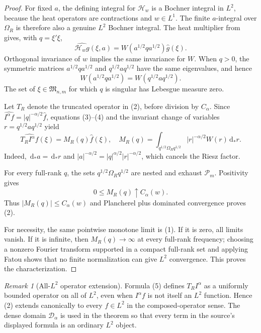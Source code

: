 \documentclass[11pt]{article}
\theoremstyle{remark}
\newtheorem{remark}[theorem]{Remark}
\newcommand{\Pm}{\mathcal P_m}
\newcommand{\Mn}{\mathfrak M_{n,m}}
\newcommand{\dd}{\,\mathrm d}
\newcommand{\Hc}{\mathcal H}
\begin{document}
\begin{proof}
For fixed $a$, the defining integral for $\Hc_w$ is a Bochner integral in
$L^2$, because the heat operators are contractions and $w\in L^1$.  The
finite $a$-integral over $\Omega_R$ is therefore also a genuine $L^2$
Bochner integral.  The heat multiplier from \cite[formula (8.15)]{source}
gives, with $q=\xi'\xi$,
\[
 \widehat{\Hc_wg}(\xi,a)=W(a^{1/2}qa^{1/2})\widehat g(\xi).       \tag{3}
\]
Orthogonal invariance of $w$ implies the same invariance for $W$.  When
$q>0$, the symmetric matrices $a^{1/2}qa^{1/2}$ and
$q^{1/2}aq^{1/2}$ have the same eigenvalues, and hence
\[
 W(a^{1/2}qa^{1/2})=W(q^{1/2}aq^{1/2}).                          \tag{4}
\]
The set of $\xi\in\Mn$ for which $q$ is singular has Lebesgue measure zero.

Let $T_R$ denote the truncated operator in (2), before division by
$C_\alpha$.  Since
$\widehat{I^\alpha f}=|q|^{-\alpha/2}\widehat f$, equations (3)--(4) and
the invariant change of variables $r=q^{1/2}aq^{1/2}$ yield
\[
 \widehat{T_RI^\alpha f}(\xi)=M_R(q)\widehat f(\xi),
\quad
 M_R(q)=\int_{q^{1/2}\Omega_Rq^{1/2}}
          |r|^{-\alpha/2}W(r)\dd_*r.                             \tag{5}
\]
Indeed, $\dd_*a=\dd_*r$ and
$|a|^{-\alpha/2}=|q|^{\alpha/2}|r|^{-\alpha/2}$, which cancels the
Riesz factor.

For every full-rank $q$, the sets $q^{1/2}\Omega_Rq^{1/2}$ are nested and
exhaust $\Pm$.  Positivity gives
\[
 0\leq M_R(q)\uparrow C_\alpha(w).
\]
Thus $|M_R(q)|\leq C_\alpha(w)$ and Plancherel plus dominated convergence
proves (2).

For necessity, the same pointwise monotone limit is (1).  If it is zero, all
limits vanish.  If it is infinite, then $M_R(q)\to\infty$ at every full-rank
frequency; choosing a nonzero Fourier transform supported in a compact
full-rank set and applying Fatou shows that no finite normalization can give
$L^2$ convergence.  This proves the characterization.
\end{proof}

\begin{remark}[All-$L^2$ operator extension]
Formula (5) defines $T_RI^\alpha$ as a uniformly bounded operator on all of
$L^2$, even when $I^\alpha f$ is not itself an $L^2$ function.  Hence (2)
extends canonically to every $f\in L^2$ in the composed-operator sense.  The
dense domain $\mathcal D_\alpha$ is used in the theorem so that every term in
the source's displayed formula is an ordinary $L^2$ object.
\end{remark}
\end{document}
